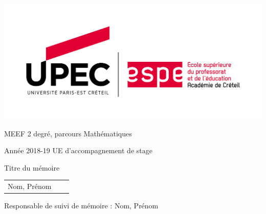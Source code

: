 \begin{titlepage}
    \begin{center}
        \includegraphics[scale=0.5]{logo_UPEC_ESPE.png}

        MEEF 2 degré, parcours Mathématiques

        Année 2018-19 UE d'accompagnement de stage

        \vspace*{\fill}

        \Huge{Titre du mémoire}

        \vspace*{\fill}

        \begin{tabular}{ccc}
            \Large{Nom, Prénom}
        \end{tabular}

        \vspace*{\fill}

        \Large{Responsable de suivi de mémoire : Nom, Prénom}

        \vspace*{\fill}
    \end{center}
\end{titlepage}
